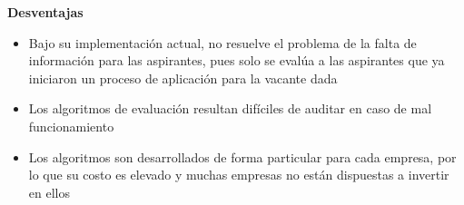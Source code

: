 \begin{itemize}
  \textbf{Desventajas}
  \begin{itemize}
    \item Bajo su implementación actual, no resuelve el problema de la falta de información para las aspirantes, pues solo se evalúa a las aspirantes que ya iniciaron un proceso de aplicación para la vacante dada
    \item  Los algoritmos de evaluación resultan difíciles de auditar en caso de mal funcionamiento
    \item Los algoritmos son desarrollados de forma particular para cada empresa, por lo que su costo es elevado y muchas empresas no están dispuestas a invertir en ellos
  \end{itemize}


  \end{itemize}

